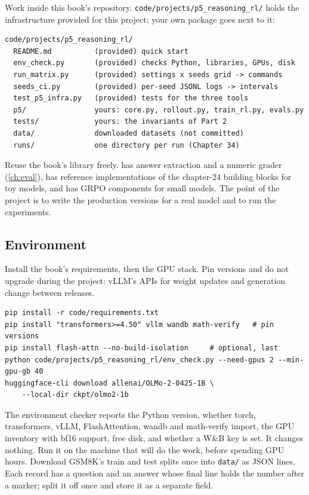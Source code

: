 Work inside this book's repository. \texttt{code/projects/p5\_reasoning\_rl/} holds the infrastructure
provided for this project; your own package goes next to it:
\begin{lstlisting}[style=plain,caption={Project layout. Only the files marked (provided) exist at the start.},label={lst:proj5:layout}]
code/projects/p5_reasoning_rl/
  README.md          (provided) quick start
  env_check.py       (provided) checks Python, libraries, GPUs, disk
  run_matrix.py      (provided) settings x seeds grid -> commands
  seeds_ci.py        (provided) per-seed JSONL logs -> intervals
  test_p5_infra.py   (provided) tests for the three tools
  p5/                yours: core.py, rollout.py, train_rl.py, evals.py
  tests/             yours: the invariants of Part 2
  data/              downloaded datasets (not committed)
  runs/              one directory per run (Chapter 34)
\end{lstlisting}
Reuse the book's library freely.  has answer extraction and a numeric grader
(\cref{ch:eval}),  has reference implementations of the chapter-24 building blocks
for toy models, and  has GRPO components for small models. The point of the project
is to write the production versions for a real model and to run the experiments.

\subsection{Environment}

Install the book's requirements, then the GPU stack. Pin versions and do not upgrade during the
project: vLLM's APIs for weight updates and generation change between releases.

\begin{lstlisting}[style=shell,caption={Environment bring-up.},label={lst:proj5:setup}]
pip install -r code/requirements.txt
pip install "transformers>=4.50" vllm wandb math-verify   # pin versions
pip install flash-attn --no-build-isolation     # optional, last
python code/projects/p5_reasoning_rl/env_check.py --need-gpus 2 --min-gpu-gb 40
huggingface-cli download allenai/OLMo-2-0425-1B \
    --local-dir ckpt/olmo2-1b
\end{lstlisting}
The environment checker reports the Python version, whether torch, transformers, vLLM,
FlashAttention, wandb and math-verify import, the GPU inventory with bf16 support, free disk, and
whether a W\&B key is set. It changes nothing. Run it on the machine that will do the work, before
spending GPU hours. Download GSM8K's train and test splits once into \texttt{data/} as JSON lines.
Each record has a question and an answer whose final line holds the number after a marker; split it
off once and store it as a separate field.

